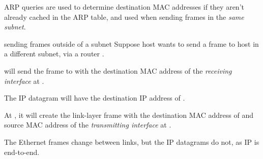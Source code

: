 ARP queries are used to determine destination MAC addresses if they aren't already cached in the ARP table,
and used when sending frames in the \textit{same subnet}.

\begin{defn}{sending frames outside of a subnet}
    Suppose host  wants to send a frame to host  in a different subnet, via a router .

     will send the frame to  with the destination MAC address of the \textit{receiving interface}
    at .

    The IP datagram will have the destination IP address of .

    At , it will create the link-layer frame with the destination MAC address of  and
    source MAC address of the \textit{transmitting interface} at .

    The Ethernet frames change between links, but the IP datagrams do not, as IP is end-to-end.
\end{defn}